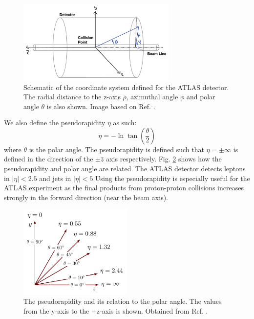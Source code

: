 \documentclass[a4paper]{report}
\numberwithin{equation}{section}
\begin{document}
\begin{figure}[htpb]
    \centering
    \includegraphics[width=0.7\textwidth]{atlas_coords.png}
    \caption{Schematic of the coordinate system defined for the ATLAS detector. The radial distance to the z-axis $\rho$, 
	azimuthal angle $\phi$ and polar angle $\theta$ is also shown. Image based on Ref. \cite{Rivera2018}.}
    \label{fig:atlas_coord}
\end{figure}

We also define the pseudorapidity $\eta$ as such: 
\begin{equation}
	\eta = -\ln \tan (\frac{\theta}{2})
\end{equation}
where $\theta$ is the polar angle. The pseudorapidity is defined such that $\eta = \pm\infty$ is defined in the direction of the 
$\pm \hat{z}$ axis respectively. Fig. \ref{fig:pseudorap} shows how the pseudorapidity and polar angle are related. The ATLAS 
detector detects leptons in $|\eta| < 2.5$ and jets in $|\eta| < 5$
Using the pseudorapidity is especially useful for the ATLAS experiment as the final products from proton-proton collisions increases 
strongly in the forward direction (near the beam axis). 

\begin{figure}[htpb]
    \centering
    \includegraphics[width=0.5\textwidth]{pseudorapidity.pdf}
    \caption{The pseudorapidity and its relation to the polar angle. The values from the y-axis to the +z-axis is shown. 
	Obtained from Ref. \cite{Izaak2017}.}
    \label{fig:pseudorap}
\end{figure}
\end{document}
